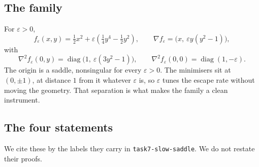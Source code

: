\documentclass[11pt,a4paper]{article}
\theoremstyle{definition}
\theoremstyle{remark}
\begin{document}
\subsection{The family}

For $\varepsilon > 0$,
\begin{equation}
  f_\varepsilon(x,y) = \tfrac12 x^2
      + \varepsilon\left(\tfrac14 y^4 - \tfrac12 y^2\right),
  \qquad
  \nabla f_\varepsilon = \bigl(x,\ \varepsilon y(y^2-1)\bigr),
  \label{eqn: f}
\end{equation}
with
\begin{equation}
  \nabla^2 f_\varepsilon(0,y)
    = \operatorname{diag}\bigl(1,\ \varepsilon(3y^2-1)\bigr),
  \qquad
  \nabla^2 f_\varepsilon(0,0) = \operatorname{diag}(1,-\varepsilon).
  \label{eqn: hessian}
\end{equation}
The origin is a saddle, nonsingular for every $\varepsilon > 0$. The minimisers
sit at $(0,\pm1)$, at distance $1$ from it whatever $\varepsilon$ is, so
$\varepsilon$ tunes the escape rate without moving the geometry. That separation
is what makes the family a clean instrument.

\subsection{The four statements}

We cite these by the labels they carry in \texttt{task7-slow-saddle}. We do not
restate their proofs.
\end{document}
